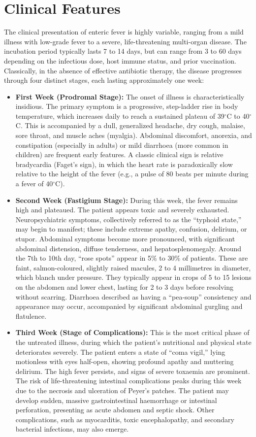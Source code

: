 \section*{Clinical Features}
The clinical presentation of enteric fever is highly variable, ranging from a mild illness with low-grade fever to a severe, life-threatening multi-organ disease. The incubation period typically lasts 7 to 14 days, but can range from 3 to 60 days depending on the infectious dose, host immune status, and prior vaccination. Classically, in the absence of effective antibiotic therapy, the disease progresses through four distinct stages, each lasting approximately one week:
\begin{itemize}
\item \textbf{First Week (Prodromal Stage):} The onset of illness is characteristically insidious. The primary symptom is a progressive, step-ladder rise in body temperature, which increases daily to reach a sustained plateau of 39$^\circ$C to 40$^\circ$C. This is accompanied by a dull, generalized headache, dry cough, malaise, sore throat, and muscle aches (myalgia). Abdominal discomfort, anorexia, and constipation (especially in adults) or mild diarrhoea (more common in children) are frequent early features. A classic clinical sign is relative bradycardia (Faget's sign), in which the heart rate is paradoxically slow relative to the height of the fever (e.g., a pulse of 80 beats per minute during a fever of 40$^\circ$C).
\item \textbf{Second Week (Fastigium Stage):} During this week, the fever remains high and plateaued. The patient appears toxic and severely exhausted. Neuropsychiatric symptoms, collectively referred to as the ``typhoid state,'' may begin to manifest; these include extreme apathy, confusion, delirium, or stupor. Abdominal symptoms become more pronounced, with significant abdominal distension, diffuse tenderness, and hepatosplenomegaly. Around the 7th to 10th day, ``rose spots'' appear in 5\% to 30\% of patients. These are faint, salmon-coloured, slightly raised macules, 2 to 4 millimetres in diameter, which blanch under pressure. They typically appear in crops of 5 to 15 lesions on the abdomen and lower chest, lasting for 2 to 3 days before resolving without scarring. Diarrhoea described as having a ``pea-soup'' consistency and appearance may occur, accompanied by significant abdominal gurgling and flatulence.
\item \textbf{Third Week (Stage of Complications):} This is the most critical phase of the untreated illness, during which the patient's nutritional and physical state deteriorates severely. The patient enters a state of ``coma vigil,'' lying motionless with eyes half-open, showing profound apathy and muttering delirium. The high fever persists, and signs of severe toxaemia are prominent. The risk of life-threatening intestinal complications peaks during this week due to the necrosis and ulceration of Peyer's patches. The patient may develop sudden, massive gastrointestinal haemorrhage or intestinal perforation, presenting as acute abdomen and septic shock. Other complications, such as myocarditis, toxic encephalopathy, and secondary bacterial infections, may also emerge.

\end{itemize}
